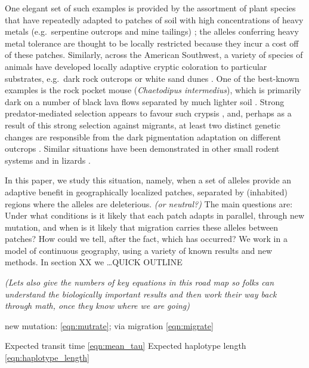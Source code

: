 \documentclass{article}
\newcommand{\gc}[1]{{\it\color{green}(#1)} }
\newcommand{\plr}[1]{{\it\color{blue}(#1)}}
\begin{document}
One elegant set of such examples is provided by the assortment of plant species 
that have repeatedly adapted to patches of soil with high concentrations of heavy metals
(e.g.\ serpentine outcrops and mine tailings) \citep{turner2010serpentine,mimulus};
the alleles conferring heavy metal tolerance are thought to be locally restricted 
because they incur a cost off of these patches. 
Similarly, across the American Southwest, a variety of species of animals have developed locally adaptive cryptic coloration
to particular substrates, e.g.\ dark rock outcrops or white sand dunes \citep{benson1933concealing}.
One of the best-known examples is the rock pocket mouse (\textit{Chaetodipus intermedius}),
which is primarily dark on a number of black lava flows separated by much lighter soil \citep{dice1940ecologic}.
Strong predator-mediated selection appears to favour such crypsis \citep{kaufman1974adaptive},
and, perhaps as a result of this strong selection against migrants, 
at least two distinct genetic changes are responsible from the dark pigmentation adaptation on different outcrops \citep{nachman2003different}. 
Similar situations have been demonstrated in other small rodent systems \citep{steiner2009genetic,kingsley2009melanism}
and in lizards \citep{whitesands}.

In this paper, we study this situation, namely,
when a set of alleles provide an adaptive benefit in geographically localized patches, 
separated by (inhabited) regions where the alleles are deleterious.
\plr{or neutral?}
The main questions are:
Under what conditions is it likely that each patch adapts in parallel, through new mutation,
and when is it likely that migration carries these alleles between patches?
How could we tell, after the fact, which has occurred?
We work in a model of continuous geography,
using a variety of known results and new methods.
In section XX we \dots QUICK OUTLINE

\gc{Lets also give the numbers of key equations in this road map so
  folks can understand the biologically important results and then work
  their way back through math, once they know where we are going}

  new mutation: \eqref{eqn:mutrate}; 
 via migration  \eqref{eqn:migrate}


Expected transit time \eqref{eqn:mean_tau}
Expected haplotype length \eqref{eqn:haplotype_length}

\end{document}
